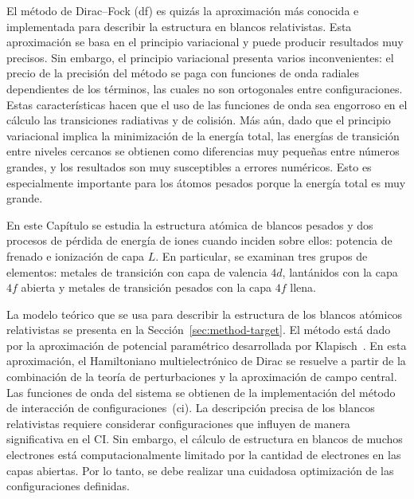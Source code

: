 El método de Dirac--Fock (\acs{df}) es quizás la aproximación más 
conocida e implementada para describir la estructura en blancos 
relativistas. Esta aproximación se basa en el principio variacional y 
puede producir resultados muy precisos. Sin embargo, el principio 
variacional presenta varios inconvenientes: el precio de la precisión 
del método se paga con funciones de onda radiales dependientes de los 
términos, las cuales no son ortogonales entre configuraciones. Estas 
características hacen que el uso de las funciones de onda sea engorroso 
en el cálculo las transiciones radiativas y de colisión. Más aún, dado 
que el principio variacional implica la minimización de la energía 
total, las energías de transición entre niveles cercanos se obtienen 
como diferencias muy pequeñas entre números grandes, y los resultados 
son muy susceptibles a errores numéricos. Esto es especialmente 
importante para los átomos pesados porque la energía total es muy 
grande. 

En este Capítulo se estudia la estructura atómica de blancos pesados
y dos procesos de pérdida de energía de iones cuando inciden sobre 
ellos: potencia de frenado e ionización de capa $L$. En particular, se 
examinan tres grupos de elementos: metales de transición con capa de 
valencia $4d$, lantánidos con la capa $4f$ abierta y metales de 
transición pesados con la capa $4f$ llena. 

La modelo teórico que se usa para describir la estructura de los 
blancos atómicos relativistas se presenta en la 
Sección~\ref{sec:method-target}. El método está dado por la aproximación 
de potencial paramétrico desarrollada por Klapisch~\cite{Klapisch:77,
Klapisch:67,Klapisch:71,BarShalom:01}. En esta aproximación, el 
Hamiltoniano multielectrónico de Dirac se resuelve a partir de la 
combinación de la teoría de perturbaciones y la aproximación de campo 
central. Las funciones de onda del sistema se obtienen de la 
implementación del método de interacción de configuraciones~(\acs{ci}). 
La descripción precisa de los blancos relativistas requiere considerar 
configuraciones que influyen de manera significativa en el CI. Sin 
embargo, el cálculo de estructura en blancos de muchos electrones está 
computacionalmente limitado por la cantidad de electrones en las capas 
abiertas. Por lo tanto, se debe realizar una cuidadosa optimización de 
las configuraciones definidas. 

